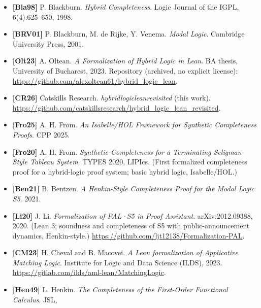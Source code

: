 \documentclass[11pt,a4paper]{article}
\renewcommand{\_}{\origtextunderscore\allowbreak}
\begin{document}
\begin{itemize}
\item
  \textbf{{[}Bla98{]}} P. Blackburn. \emph{Hybrid Completeness}. Logic Journal of the IGPL, 6(4):625--650, 1998.
\item
  \textbf{{[}BRV01{]}} P. Blackburn, M. de Rijke, Y. Venema. \emph{Modal Logic}. Cambridge University Press, 2001.
\item
  \textbf{{[}Olt23{]}} A. Oltean. \emph{A Formalization of Hybrid Logic in Lean}. BA thesis, University of Bucharest, 2023. Repository (archived, no explicit license): \url{https://github.com/alexoltean61/hybrid_logic_lean}.
\item
  \textbf{{[}CR26{]}} Catskills Research. \emph{hybrid\_logic\_lean\_revisited} (this work). \url{https://github.com/catskillsresearch/hybrid_logic_lean_revisited}.
\item
  \textbf{{[}Fro25{]}} A. H. From. \emph{An Isabelle/HOL Framework for Synthetic Completeness Proofs}. CPP 2025.
\item
  \textbf{{[}Fro20{]}} A. H. From. \emph{Synthetic Completeness for a Terminating Seligman-Style Tableau System}. TYPES 2020, LIPIcs. (First formalized completeness proof for a hybrid-logic proof system; basic hybrid logic, Isabelle/HOL.)
\item
  \textbf{{[}Ben21{]}} B. Bentzen. \emph{A Henkin-Style Completeness Proof for the Modal Logic S5}. 2021.
\item
  \textbf{{[}Li20{]}} J. Li. \emph{Formalization of PAL·S5 in Proof Assistant}. arXiv:2012.09388, 2020. (Lean 3; soundness and completeness of S5 with public-announcement dynamics, Henkin-style.) \url{https://github.com/ljt12138/Formalization-PAL}.
\item
  \textbf{{[}CM23{]}} H. Cheval and B. Macovei. \emph{A Lean formalization of Applicative Matching Logic}. Institute for Logic and Data Science (ILDS), 2023. \url{https://gitlab.com/ilds/aml-lean/MatchingLogic}.
\item
  \textbf{{[}Hen49{]}} L. Henkin. \emph{The Completeness of the First-Order Functional Calculus}. JSL,


\end{itemize}
\end{document}

